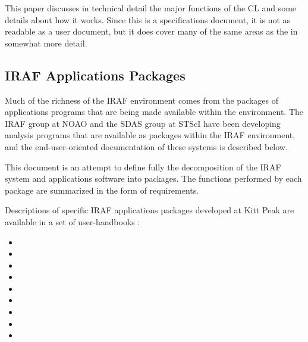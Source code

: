 \noindent
{}

This paper discusses in technical detail the major functions of the CL
and some details about how it works.  Since this is a specifications
document, it is not as readable as a user document, but it
does cover many of the same areas as the 
in somewhat more detail.

\subsection{IRAF Applications Packages}

Much of the richness of the IRAF environment comes from the packages
of applications programs that are being made available within the 
environment. The IRAF group at NOAO and the SDAS group at STScI have been
developing analysis programs that are available as packages
within the IRAF environment, and the end-user-oriented documentation of
these systems is described below.

\noindent
{}

This document is an attempt to define fully the decomposition of the IRAF
system and applications software into packages. The functions performed by
each package are summarized in the form of requirements.

Descriptions of specific IRAF applications packages developed at Kitt Peak
are available in a set of user-handbooks :

\begin{itemize}
\item {}
\item {}
\item {}
\item {} 
\item {}
\item {}
\item {}
\item {} 
\item {}
\end{itemize}


